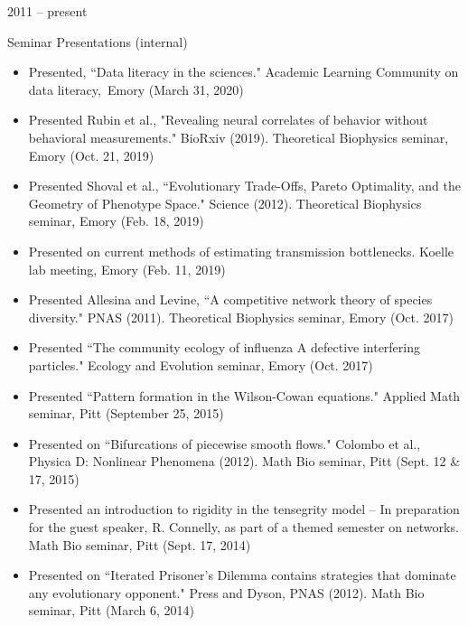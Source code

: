 \documentclass[a4paper,10pt]{article}
\newlength{\cvcolumngapwidth}
\newlength{\cvleftcolumnwidth}
\newlength{\cvrightcolumnwidth}
\newcommand{\cvtitlestyle}[1]{{\large\cvtitlefont\textcolor{cvtitlecolor}{#1}}}
\newcommand{\cvdurationstyle}[1]{{\small\cvdurationfont\textcolor{cvdurationcolor}{#1}}}
\newlength{\cvafteritemskipamount}
\newlength{\cvaftertitleskipamount}
\newlength{\cvparskip}
\newcommand{\cvitem}[2]{
    \begin{minipage}[t]{\cvleftcolumnwidth}
        \raggedleft #1
    \end{minipage}%
    \hspace{\cvcolumngapwidth}%
    \begin{minipage}[t]{\cvrightcolumnwidth}
        \setlength{\parskip}{\cvparskip} #2
    \end{minipage}

    \vspace{\cvafteritemskipamount}
}
\newcommand{\cvtitle}[1]{
    \cvtitlestyle{#1}

    \vspace{\cvaftertitleskipamount}
    \vspace{-\cvparskip}
}
\begin{document}
\cvitem{
    \cvdurationstyle{2011 -- present}
}{
    \cvtitle{Seminar Presentations (internal)}
    \begin{itemize}[leftmargin=*]
    	\item Presented, ``Data literacy in the sciences."  Academic Learning Community on data literacy,\, Emory (March 31, 2020)\\
    	\item Presented Rubin et al., "Revealing neural correlates of behavior without behavioral measurements." BioRxiv (2019). Theoretical Biophysics seminar, Emory (Oct. 21, 2019) \\
        \item Presented Shoval et al., ``Evolutionary Trade-Offs, Pareto Optimality, and the Geometry of Phenotype Space." Science (2012). Theoretical Biophysics seminar, Emory (Feb. 18, 2019) \\
        \item Presented on current methods of estimating transmission bottlenecks. Koelle lab meeting, Emory (Feb. 11, 2019) \\
        \item Presented Allesina and Levine, ``A competitive network theory of species diversity." PNAS (2011). Theoretical Biophysics seminar, Emory (Oct. 2017) \\
        \item Presented  ``The community ecology of influenza A defective interfering particles." Ecology and Evolution seminar, Emory (Oct. 2017) \\
    \end{itemize}
    \begin{itemize}[leftmargin=*]
        \item Presented ``Pattern formation in the Wilson-Cowan equations." Applied Math seminar, Pitt (September 25, 2015) \\
        \item Presented on ``Bifurcations of piecewise smooth flows." Colombo et al., Physica D: Nonlinear Phenomena (2012). Math Bio seminar, Pitt (Sept. 12 \& 17, 2015) \\
        \item Presented an introduction to rigidity in the tensegrity model -- In preparation for the guest speaker, R. Connelly, as part of a themed semester on networks. Math Bio seminar, Pitt (Sept. 17, 2014) \\
        \item Presented on ``Iterated Prisoner's Dilemma contains strategies that dominate any evolutionary opponent." Press and Dyson, PNAS (2012). Math Bio seminar, Pitt (March 6, 2014) \\

\end{itemize}}
\end{document}
